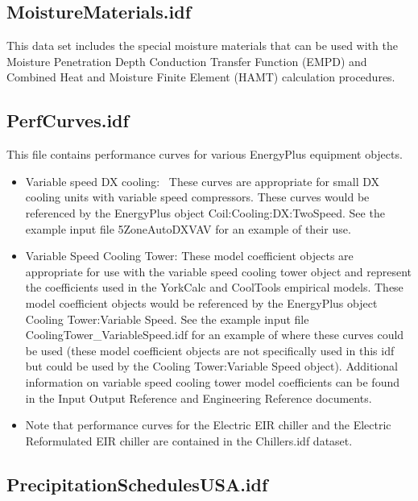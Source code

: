 \subsection{MoistureMaterials.idf}\label{moisturematerials.idf}

This data set includes the special moisture materials that can be used with the Moisture Penetration Depth Conduction Transfer Function (EMPD) and Combined Heat and Moisture Finite Element (HAMT) calculation procedures.

\subsection{PerfCurves.idf}\label{perfcurves.idf}

This file contains performance curves for various EnergyPlus equipment objects.

\begin{itemize}
\item
  Variable speed DX cooling:~ These curves are appropriate for small DX cooling units with variable speed compressors. These curves would be referenced by the EnergyPlus object Coil:Cooling:DX:TwoSpeed. See the example input file 5ZoneAutoDXVAV for an example of their use.
\item
  Variable Speed Cooling Tower: These model coefficient objects are appropriate for use with the variable speed cooling tower object and represent the coefficients used in the YorkCalc and CoolTools empirical models. These model coefficient objects would be referenced by the EnergyPlus object Cooling Tower:Variable Speed. See the example input file CoolingTower\_VariableSpeed.idf for an example of where these curves could be used (these model coefficient objects are not specifically used in this idf but could be used by the Cooling Tower:Variable Speed object). Additional information on variable speed cooling tower model coefficients can be found in the Input Output Reference and Engineering Reference documents.
\item
  Note that performance curves for the Electric EIR chiller and the Electric Reformulated EIR chiller are contained in the Chillers.idf dataset.
\end{itemize}

\subsection{PrecipitationSchedulesUSA.idf}\label{precipitationschedulesusa.idf}

